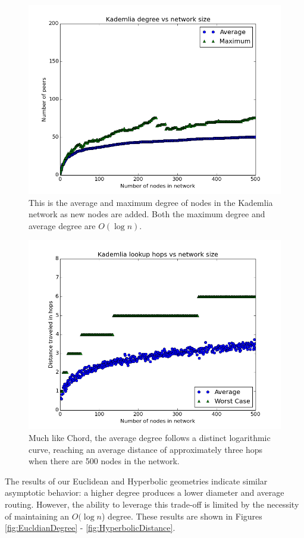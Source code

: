 \documentclass[11pt,conference]{IEEEtran}
\begin{document}
\begin{figure}
	\centering
	\includegraphics[width=0.7\linewidth]{figs/KademliaDegree}
	\caption{This is the average and maximum degree of nodes in the Kademlia network as new nodes are added.  Both the maximum degree and average degree are $O(\log n)$.}
	\label{fig:KademliaDegree}
\end{figure}
\begin{figure}
	\centering
	\includegraphics[width=0.7\linewidth]{figs/KademliaDistance}
	\caption{Much like Chord, the average degree follows a distinct logarithmic curve, reaching an average distance of approximately three hops when there are 500 nodes in the network.}
	\label{fig:KademliaDistance}
\end{figure}



The results of our Euclidean and Hyperbolic geometries indicate similar asymptotic behavior: a higher degree produces a lower diameter and average routing. 
However, the ability to leverage this trade-off is limited by the necessity of maintaining an $ O(\log n $) degree.
These results are shown in Figures \ref{fig:EucldianDegree} - \ref{fig:HyperbolicDistance}.
\end{document}
